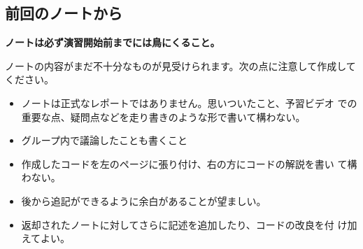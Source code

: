 \documentclass[a4j]{jarticle}
\begin{document}
	\subsection{前回のノートから}
{\bfseries ノートは必ず演習開始前までには鳥にくること。}

ノートの内容がまだ不十分なものが見受けられます。次の点に注意して作成して
ください。
\begin{itemize}
 \item ノートは正式なレポートではありません。思いついたこと、予習ビデオ
       での重要な点、疑問点などを走り書きのような形で書いて構わない。
 \item グループ内で議論したことも書くこと
 \item 作成したコードを左のページに張り付け、右の方にコードの解説を書い
       て構わない。
 \item 後から追記ができるように余白があることが望ましい。
 \item 返却されたノートに対してさらに記述を追加したり、コードの改良を付
       け加えてよい。
\end{itemize}
\fi
\end{document}
